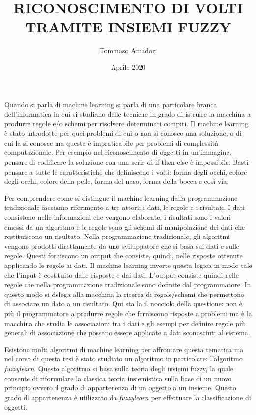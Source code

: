 \documentclass[12pt]{article}
\title{RICONOSCIMENTO DI VOLTI\\ TRAMITE INSIEMI FUZZY}
\author{Tommaso Amadori}
\date{Aprile 2020}
\begin{document}
\maketitle

Quando si parla di machine learning si parla di una particolare branca dell'informatica in cui si studiano delle tecniche in grado di istruire la macchina a produrre regole e/o schemi per risolvere determinati compiti. Il machine learning è stato introdotto per quei problemi di cui o non si conosce una soluzione, o di cui la si conosce ma questa è impraticabile per problemi di complessità computazionale.
Per esempio nel riconoscimento di oggetti in un'immagine, pensare di codificare la soluzione con una serie di if-then-else è impossibile. Basti pensare a tutte le caratteristiche che definiscono i volti: forma degli occhi, colore degli occhi, colore della pelle, forma del naso, forma della bocca e così via. 

Per comprendere come si distingue il machine learning dalla programmazione tradizionale facciamo riferimento a tre attori: i dati, le regole e i risultati. I dati consistono nelle informazioni che vengono elaborate, i risultati sono i valori emessi da un algoritmo e le regole sono gli schemi di manipolazione dei dati che restituiscono un risultato.
Nella programmazione tradizionale, gli algoritmi vengono prodotti direttamente da uno sviluppatore che si basa sui dati e sulle regole. Questi forniscono un output che consiste, quindi, nelle risposte ottenute applicando le regole ai dati. Il machine learning inverte questa logica in modo tale che l'input è costituito dalle risposte e dai dati. L'output consiste quindi nelle regole che nella programmazione tradizionale sono definite dal programmatore. In questo modo si delega alla macchina la ricerca di regole/schemi che permettono di associare un dato a un risultato. Qui sta la il nocciolo della questione: non è più il programmatore a produrre regole che forniscono risposte a problemi ma è la macchina che studia le associazioni tra i dati e gli esempi per definire regole più generali di associazione che possano essere applicate a dati sconosciuti al sistema.

Esistono molti algoritmi di machine learning per affrontare questa tematica ma nel corso di questa tesi è stato studiato un algoritmo in particolare: l'algoritmo \emph{fuzzylearn}. Questo algoritmo si basa sulla teoria degli insiemi fuzzy, la quale consente di riformulare la classica teoria insiemistica sulla base di un nuovo principio ovvero il grado di appartenenza di un oggetto a un insieme. Questo grado di appartenenza è utilizzato da \emph{fuzzylearn} per effettuare la classificazione di oggetti.
\end{document}
